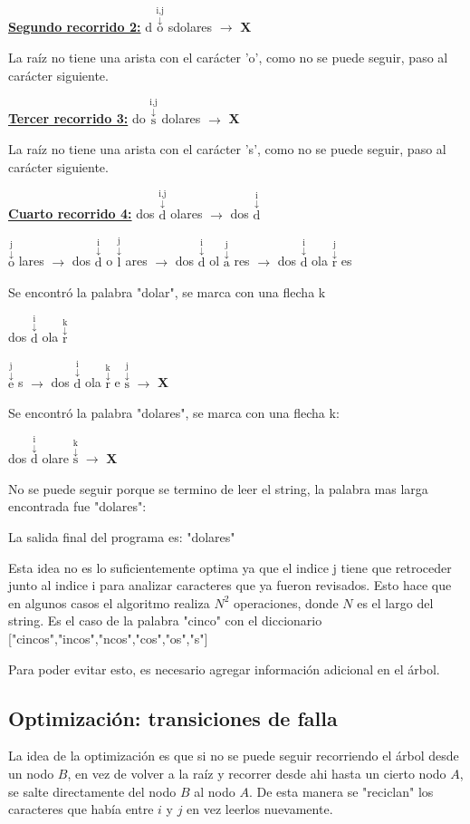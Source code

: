 \documentclass{article}
\newcommand{\flecha}[2] {
    \!\!$\overset{\text{#1}}{\overset{\downarrow}{\text{#2}}}$\!\!
}
\begin{document}
{\color{blue} \underline{\textbf{Segundo recorrido 2:}}} d\flecha{i,j}osdolares $\rightarrow$ {\color{red} \textbf X}

La raíz no tiene una arista con el carácter 'o', como no se puede seguir, paso al carácter siguiente.

{\color{Green} \underline{\textbf{Tercer recorrido 3:}}} do\flecha{i,j}sdolares $\rightarrow$ {\color{red} \textbf X}

La raíz no tiene una arista con el carácter 's', como no se puede seguir, paso al carácter siguiente.

{\color{violet} \underline{\textbf{Cuarto recorrido 4:}}} dos\flecha{i,j}dolares $\rightarrow$ dos\flecha{i}d\flecha{j}olares $\rightarrow$ dos\flecha i do\flecha j lares
$\rightarrow$ dos\flecha i dol\flecha j ares $\rightarrow$ dos\flecha i dola\flecha j res

Se encontró la palabra "dolar", se marca con una flecha k

dos\flecha i dola\flecha k r\flecha j es $\rightarrow$ dos\flecha i dola\flecha k re\flecha j s $\rightarrow$ {\color{red}\textbf{X}}

Se encontró la palabra "dolares", se marca con una flecha k:

dos\flecha i dolare\flecha k s $\rightarrow$ {\color{red}\textbf{X}}

No se puede seguir porque se termino de leer el string, la palabra mas larga encontrada fue "dolares":

La salida final del programa es: "dolares"

Esta idea no es lo suficientemente optima ya que el indice j tiene que retroceder junto al indice i para analizar caracteres que
ya fueron revisados. Esto hace que en algunos casos el algoritmo realiza $N^2$ operaciones, donde $N$ es el largo del string. Es el caso
de la palabra "cinco" con el diccionario ["cincos","incos","ncos","cos","os","s"]

Para poder evitar esto, es necesario agregar información adicional en el árbol.

\subsection*{Optimización: transiciones de falla}

La idea de la optimización es que si no se puede seguir recorriendo el árbol desde un nodo $B$, en vez de volver a la raíz y recorrer desde ahi hasta un cierto nodo $A$,
se salte directamente del nodo $B$ al nodo $A$. De esta manera se "reciclan" los caracteres que había entre $i$ y $j$ en vez leerlos nuevamente.
\end{document}
